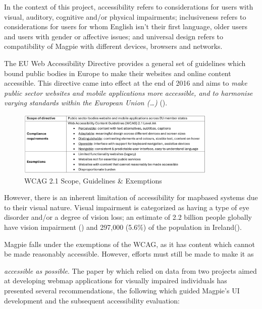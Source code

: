 In the context of this project, accessibility refers to considerations for users
with visual, auditory, cognitive and/or physical impairments; inclusiveness
refers to considerations for users for whom English isn't their first language,
older users and users with gender or affective issues; and universal design
refers to compatibility of Magpie with different devices, browsers and
networks.

The EU Web Accessibility Directive provides a general set of guidelines which
bound public bodies in Europe to make their websites and online content
accessible. This directive came into effect at the end of 2016 and aims to
\emph{make public sector websites and mobile applications more accessible, and
to harmonise varying standards within the European Union (\ldots)}
(\cite{webaccessibilitydirective2016}).

\begin{figure}[h!]
    \centering
    \includegraphics[width=0.85\textwidth]{images/wcag-guidelines.png}
    \caption{WCAG 2.1 Scope, Guidelines \& Exemptions}
\end{figure}

However, there is an inherent limitation of accessibility for
map\-based systems due to their visual nature. Visual impairment is categorized
as having a type of eye disorder and/or a degree of vision loss; an estimate of
2.2 billion people globally have vision impairment
(\cite{whoworldreportvision2019}) and 297,000 (5.6\%) of the population in
Ireland(\cite{visionirelandcensus}).

Magpie falls under the exemptions of the WCAG, as it has content which cannot be
made reasonably accessible. However, efforts must still be made to make it as

\emph{accessible as possible}. \noindent The paper by
\cite{accessibilitywebmapsrecommendations2017} which relied on data from two
projects aimed at developing web\-map applications for visually impaired
individuals has presented several recommendations, the following which guided
Magpie's UI development and the subsequent accessibility evaluation:

